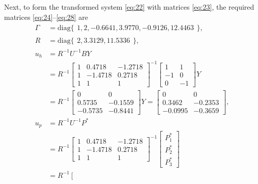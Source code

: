 \documentclass[letter, 10pt, conference]{ieeeconf}
\newcommand{\diag}{\mathrm{diag}}
\newcommand{\1}{\mathbf{1}}
\newcommand{\0}{\mathbf{0}}
\begin{document}
{Next, to form the transformed system \eqref{eq:22} with matrices
\eqref{eq:23}, the required matrices \eqref{eq:24}--\eqref{eq:28} are
\begin{align*}
	\Gamma &= \diag
		\{\begin{smallmatrix}
			1 , 2 , -0.6641 , 3.9770 , -0.9126 , 12.4463 
		\end{smallmatrix}\}, \\
	R &=\diag \{\begin{smallmatrix}
		2 , 3.3129 , 11.5336
		\end{smallmatrix}\}, \\
	u_h &=R^{-1} U^{-1} B Y \\
	&=R^{-1}
	\left[\begin{smallmatrix}
		1 &   0.4718  & -1.2718 \\
    	1 &  -1.4718  &  0.2718 \\
    	1 &   1       &  1
	\end{smallmatrix}\right]^{-1}
	\left[\begin{smallmatrix} 
		1 & 1 \\ -1 & 0 \\ 0 & -1
	\end{smallmatrix}\right]
	Y
	\\
	&=R^{-1}
	\left[\begin{smallmatrix}
		0 & 0 \\ 0.5735 & -0.1559 \\ -0.5735 & -0.8441
	\end{smallmatrix}\right]
	Y
	=\left[\begin{smallmatrix}
		 0      &  0      \\
    	 0.3462 & -0.2353 \\
   		-0.0995 & -0.3659
	\end{smallmatrix}\right],
	\\	u_p
	&=R^{-1} U^{-1} P^* 
	\\
	&=R^{-1}
	\left[\begin{smallmatrix}
		1 &   0.4718  & -1.2718 \\
    	1 &  -1.4718  &  0.2718 \\
    	1 &   1       &  1
	\end{smallmatrix}\right]^{-1}
	\left[\begin{smallmatrix}
		P_1^* \\ P_2^* \\ P_3^*
	\end{smallmatrix}\right] 
	\\
	&=R^{-1}
	\left[\begin{smallmatrix}

\end{smallmatrix}
\end{align*}}
\end{document}
